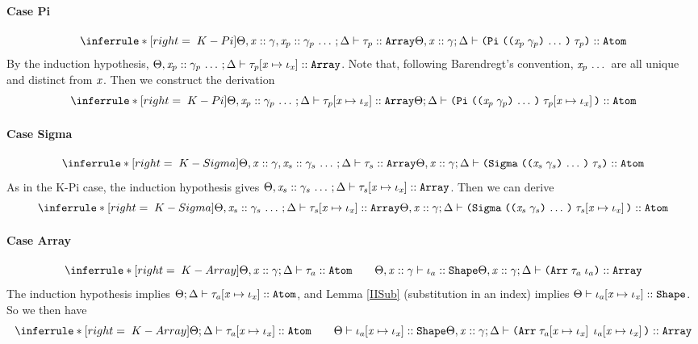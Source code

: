 \begin{sproof}
  \paragraph{Case {\sc Pi}}
  \[\infr[K-Pi]
  {\kindof{\sEnv,\hassort{\var}{\sort}, \sequence{\hassort{\var_p}{\sort_p}}}{\kEnv}
    {\type_p}{\kindarray}}
  {\kindof{\sEnv,\hassort{\var}{\sort}}{\kEnv}
    {\typedprod{\sequence{\notevar{\var_p}{\sort_p}}}{\type_p}}
    {\kindatom}}\]
  By the induction hypothesis,
  $\Theta, \mathit{x}_p :: \mathit{\gamma}_p \, \ldots \,;\Delta \vdash \mathit{\tau}_p\hspace{-2pt}\left[ \mathit{x} \mapsto \mathit{\iota}_{\mathit{x}} \right] :: \text{\tt Array}$.
  Note that, following Barendregt's convention, $\mathit{x}_p \, \ldots \,$ are all unique and distinct from $\mathit{x}$.
  Then we construct the derivation
  \[\infr[K-Pi]
  {\kindof{\sEnv, \sequence{\hassort{\var_p}{\sort_p}}}{\kEnv}
    {\idxsubst{\type_p}}{\kindarray}}
  {\kindof{\sEnv}{\kEnv}
    {\typedprod{\sequence{\notevar{\var_p}{\sort_p}}}{\idxsubst{\type_p}}}
    {\kindatom}}\]
  \paragraph{Case {\sc Sigma}}
  \[\infr[K-Sigma]
  {\kindof{\sEnv,\hassort{\var}{\sort}, \sequence{\hassort{\var_s}{\sort_s}}}{\kEnv}
    {\type_s}{\kindarray}}
  {\kindof{\sEnv,\hassort{\var}{\sort}}{\kEnv}
    {\typedsum{\sequence{\notevar{\var_s}{\sort_s}}}{\type_s}}
    {\kindatom}}\]
  As in the {\sc K-Pi} case, the induction hypothesis gives
  $\Theta, \mathit{x}_s :: \mathit{\gamma}_s \, \ldots \,;\Delta \vdash \mathit{\tau}_s\hspace{-2pt}\left[ \mathit{x} \mapsto \mathit{\iota}_{\mathit{x}} \right] :: \text{\tt Array}$.
  Then we can derive
  \[\infr[K-Sigma]
  {\kindof{\sEnv, \sequence{\hassort{\var_s}{\sort_s}}}{\kEnv}
    {\idxsubst{\type_s}}{\kindarray}}
  {\kindof{\sEnv,\hassort{\var}{\sort}}{\kEnv}
    {\typedsum{\sequence{\notevar{\var_s}{\sort_s}}}{\idxsubst{\type_s}}}
    {\kindatom}}\]
  \paragraph{Case {\sc Array}}
  \[\infr[K-Array]
  {\kindof{\sEnv,\hassort{\var}{\sort}}{\kEnv}{\type_a}{\kindatom}
    \qquad \sortof{\sEnv,\hassort{\var}{\sort}}{\idx_a}{\sortshp}}
  {\kindof{\sEnv,\hassort{\var}{\sort}}{\kEnv}
    {\typearray{\type_a}{\idx_a}}
    {\kindarray}}\]
  The induction hypothesis implies
  $\Theta;\Delta \vdash \mathit{\tau}_a\hspace{-2pt}\left[ \mathit{x} \mapsto \mathit{\iota}_{\mathit{x}} \right] :: \text{\tt Atom}$,
  and Lemma \ref{IISub} (substitution in an index) implies
  $\Theta \vdash \mathit{\iota}_a\hspace{-2pt}\left[ \mathit{x} \mapsto \mathit{\iota}_{\mathit{x}} \right] :: \text{\tt Shape}$.
  So we then have
  \[\infr[K-Array]
  {\kindof{\sEnv}{\kEnv}{\idxsubst{\type_a}}{\kindatom}
    \qquad \sortof{\sEnv}{\idxsubst{\idx_a}}{\sortshp}}
  {\kindof{\sEnv,\hassort{\var}{\sort}}{\kEnv}
    {\typearray{\idxsubst{\type_a}}{\idxsubst{\idx_a}}}
    {\kindarray}}\]
\end{sproof}

